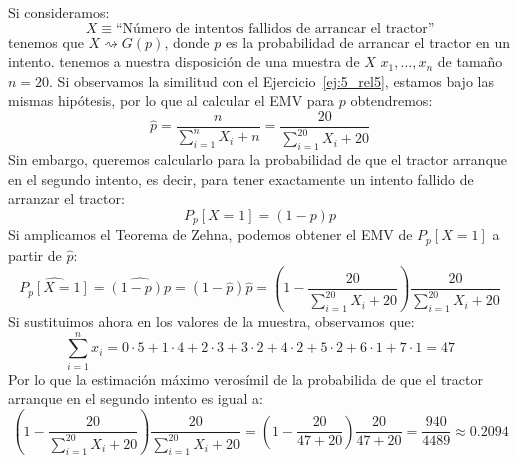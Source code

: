 \begin{ejercicio}
    Si consideramos:
    \begin{equation*}
        X \equiv \text{``Número de intentos fallidos de arrancar el tractor''}
    \end{equation*}
    tenemos que $X\rightsquigarrow G(p)$, donde $p$ es la probabilidad de arrancar el tractor en un intento. tenemos a nuestra disposición de una muestra de $X$ $x_1,\ldots, x_n$ de tamaño $n=20$. Si observamos la similitud con el Ejercicio~\ref{ej:5_rel5}, estamos bajo las mismas hipótesis, por lo que al calcular el EMV para $p$ obtendremos:
    \begin{equation*}
        \hat{p} = \frac{n}{\sum\limits_{i=1}^{n}X_i+n} = \frac{20}{\sum\limits_{i=1}^{20}X_i+20}
    \end{equation*}
    Sin embargo, queremos calcularlo para la probabilidad de que el tractor arranque en el segundo intento, es decir, para tener exactamente un intento fallido de arranzar el tractor:
    \begin{equation*}
        P_p[X = 1] = (1-p)p
    \end{equation*}
    Si amplicamos el Teorema de Zehna, podemos obtener el EMV de $P_p[X=1]$ a partir de $\hat{p}$:
    \begin{equation*}
        \widehat{P_p[X=1]} = \widehat{(1-p)p} = (1-\hat{p})\hat{p} = \left(1-\frac{20}{\sum\limits_{i=1}^{20}X_i+20}\right) \frac{20}{\sum\limits_{i=1}^{20}X_i+20}
    \end{equation*}
    Si sustituimos ahora en los valores de la muestra, observamos que:
    \begin{equation*}
        \sum_{i=1}^{n}x_i = 0\cdot 5 + 1\cdot 4 + 2\cdot 3 + 3\cdot 2 + 4\cdot 2 + 5\cdot 2 + 6\cdot 1 + 7\cdot 1 = 47
    \end{equation*}
    Por lo que la estimación máximo verosímil de la probabilida de que el tractor arranque en el segundo intento es igual a:
    \begin{equation*}
        \left(1-\frac{20}{\sum\limits_{i=1}^{20}X_i+20}\right) \frac{20}{\sum\limits_{i=1}^{20}X_i+20} = \left(1-\frac{20}{47+20}\right) \frac{20}{47+20} = \frac{940}{4489} \approx 0.2094
    \end{equation*}
\end{ejercicio}

